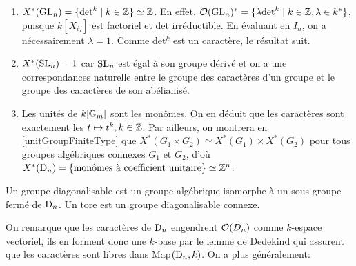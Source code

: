 \begin{ex}
\begin{enumerate}
\item $X^*(\operatorname{GL}_n)=\lbrace \det^k\mid k\in \mathbb{Z} \rbrace\simeq\mathbb{Z}$. En effet, $\mathcal{O}(\operatorname{GL}_n)^* =\lbrace \lambda\textrm{det}^k\mid k\in \mathbb{Z}, \lambda\in k^* \rbrace$, puisque $k[X_{ij}]$ est factoriel et det irréductible. En évaluant en $I_n$, on a nécessairement $\lambda=1$. Comme det$^k$ est un caractère, le résultat suit.
\item $X^*(\operatorname{SL}_n)={1}$ car $\operatorname{SL}_n$ est égal à son groupe dérivé et on a une correspondances naturelle entre le groupe des caractères d'un groupe et le groupe des caractères de son abélianisé.
\item Les unités de $k[\mathbb{G}_m]$ sont les monômes. On en déduit que les caractères sont exactement les $t\mapsto t^k, k\in \mathbb{Z}$. Par ailleurs, on montrera en \ref{unitGroupFiniteType} que $X^*(G_1\times G_2)\simeq X^*(G_1)\times X^*(G_2)$ pour tous groupes algébriques connexes $G_1$ et $G_2$, d'où $X^*(\operatorname{D}_n)=\lbrace \textrm{monômes à coefficient unitaire} \rbrace \simeq \mathbb{Z}^n$.
\end{enumerate}
\end{ex}

\begin{defn}
Un groupe diagonalisable est un groupe algébrique isomorphe à un sous groupe fermé de $\operatorname{D}_n$. Un tore est un groupe diagonalisable connexe.
\end{defn}

On remarque que les caractères de $\operatorname{D}_n$ engendrent $\mathcal{O}(D_n)$ comme $k$-espace vectoriel, ils en forment donc une $k$-base par le lemme de Dedekind qui assurent que les caractères sont libres dans Map$(\operatorname{D}_n, k)$. On a plus généralement:

